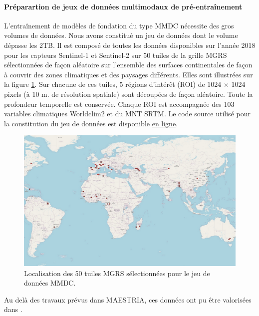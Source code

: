 \paragraph{Préparartion de jeux de données multimodaux de pré-entraînement}

L’entraînement de modèles de fondation du type MMDC nécessite des gros volumes de données. Nous avons constitué un jeu de données dont le volume dépasse les 2TB. Il est composé de toutes les données disponibles sur l’année 2018 pour les capteurs Sentinel-1 et Sentinel-2 sur 50 tuiles de la grille MGRS sélectionnées de façon aléatoire sur l’ensemble des surfaces continentales de façon à couvrir des zones climatiques et des paysages différents. Elles sont illustrées sur la figure \ref{fig:mmdctiles}. Sur chacune de ces tuiles, 5 régions d’intérêt (ROI) de 1024 $\times$ 1024 pixels (à 10 m. de résolution spatiale) sont découpées de façon aléatoire. Toute la profondeur temporelle est conservée. Chaque ROI est accompagnée des 103 variables climatiques Worldclim2 et du MNT SRTM. Le code source utilisé pour la constitution du jeu de données est disponible \href{https://src.koda.cnrs.fr/mmdc/mmdc-datacollection}{en ligne}.


\begin{figure}
\begin{center}
\includegraphics[width=\columnwidth]{img/wp1/tiles.pdf}
\caption{Localisation des 50 tuiles MGRS sélectionnées pour le jeu de données MMDC.}
\label{fig:mmdctiles}
\end{center}
\end{figure}

Au delà des travaux prévus dans MAESTRIA, ces données ont pu être valorisées dans \citep{dumeur-2023-self-satel}.


